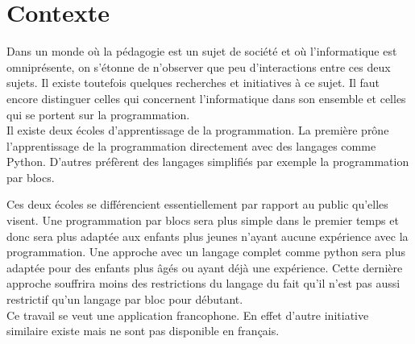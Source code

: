 \section{Contexte}
\label{intro-context}
Dans un monde où la pédagogie est un sujet de société et où l'informatique est omniprésente, on s'étonne de n'observer que peu d'interactions entre ces deux sujets. Il existe toutefois quelques recherches et initiatives à ce sujet. Il faut encore distinguer celles qui concernent l'informatique dans son ensemble et celles qui se portent sur la programmation.\\

Il existe deux écoles d'apprentissage de la programmation. La première prône l'apprentissage de la programmation directement avec des langages comme Python. D'autres préfèrent des langages simplifiés par exemple la programmation par blocs. 

Ces deux écoles se différencient essentiellement par rapport au public qu'elles visent. Une programmation par blocs sera plus simple dans le premier temps et donc sera plus adaptée aux enfants plus jeunes n'ayant aucune expérience avec la programmation. Une approche avec un langage complet comme python sera plus adaptée pour des enfants plus âgés ou ayant déjà une expérience. Cette dernière approche souffrira moins des restrictions du langage du fait qu'il n'est pas aussi restrictif qu'un langage par bloc pour débutant.\\

Ce travail se veut une application francophone. En effet d'autre initiative similaire existe mais ne sont pas disponible en français.



